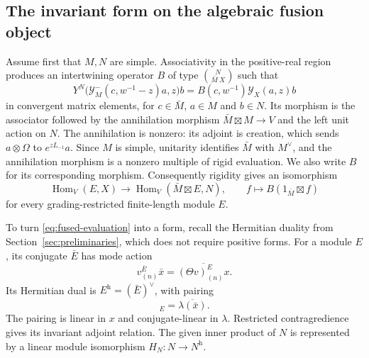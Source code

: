 \subsection{The invariant form on the algebraic fusion object}

Assume first that $M,N$ are simple.  Associativity in the
positive-real region produces an intertwining operator $B$ of type
$\binom{N}{\bar M\ X}$ such that
\begin{equation}
 Y^N\big(\mathcal Y_M^-(c,w^{-1}-z)a,z\big)b
 =B(c,w^{-1})\mathcal Y_X(a,z)b
 \label{eq:fused-evaluation}
\end{equation}
in convergent matrix elements, for $c\in\bar M$, $a\in M$ and
$b\in N$.  Its morphism is the associator
followed by the annihilation morphism
$\bar M\boxtimes M\longrightarrow V$ and the left unit action on
$N$.  The annihilation is nonzero: its adjoint is creation, which
sends $a\otimes\Omega$ to $e^{zL_{-1}}a$.  Since $M$ is simple,
unitarity identifies $\bar M$ with $M^\vee$, and the annihilation
morphism is a nonzero multiple of rigid evaluation.  We also write
$B$ for its corresponding morphism.  Consequently
rigidity gives an isomorphism
\begin{equation}
 \operatorname{Hom}_V(E,X)\longrightarrow
 \operatorname{Hom}_V(\bar M\boxtimes E,N),
 \qquad f\longmapsto B(1_{\bar M}\boxtimes f)
 \label{eq:rigid-transport-adjunction}
\end{equation}
for every grading-restricted finite-length module $E$.

To turn \eqref{eq:fused-evaluation} into a form, recall the Hermitian
duality from Section~\ref{sec:preliminaries}, which does not require
positive forms.  For a module $E$, its conjugate
$\bar E$ has mode action
\[
 v_{(n)}^{\bar E}\bar x
   =\overline{(\Theta v)_{(n)}^E x}.
\]
Its Hermitian dual is $E^{\mathrm h}=(\bar E)^\vee$, with pairing
\begin{equation}
 [x,\lambda]_E=\overline{\lambda(\bar x)}.
 \label{eq:hermitian-dual-pairing}
\end{equation}
The pairing is linear in $x$ and conjugate-linear in $\lambda$.
Restricted contragredience gives its invariant adjoint relation.
The given inner product of $N$ is represented by a linear module
isomorphism $H_N:N\longrightarrow N^{\mathrm h}$.


